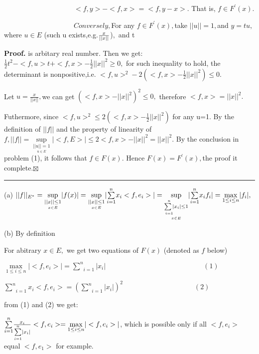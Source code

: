 \documentclass{article}
\newenvironment{proof}[1][Proof]{\noindent\textbf{#1.} }{\ \rule{0.5em}{0.5em}}
\begin{document}
$\qquad \qquad \qquad \qquad \qquad <f,y>-<f,x>=<f,y-x>.$ That is, $f\in
F^{\prime }(x).$

$\qquad \qquad \qquad \qquad \qquad Conversely,$For any $f\in F^{\prime
}(x), $take $||u||=1,$and $y=tu,$where $u\in E$ (such u exists,e.g.$\frac{x}{%
||x||} $)$,$ and t

\begin{proof}
is arbitary real number. Then we get: $\frac{1}{2}t^{2}-<f,u>t+<f,x>-\frac{1%
}{2}||x||^{2}\geq 0,$ for such inequality to hold, the determinant is
nonpositive,i.e. $<f,u>^{2}-2(<f,x>-\frac{1}{2}||x||^{2})\leq 0.$

Let $u=\frac{x}{||x||},$we can get $(<f,x>-||x||^{2})^{2}\leq 0,$ therefore $%
<f,x>=||x||^{2}.$

Futhermore, since $<f,u>^{2}\leq 2(<f,x>-\frac{1}{2}||x||^{2})$ for any 
\TEXTsymbol{\vert}\TEXTsymbol{\vert}u\TEXTsymbol{\vert}\TEXTsymbol{\vert}=1.
By the definition of $||f||$ and the property of linearity of $f,||f||=%
\underset{\underset{u\in E}{||u||=1}}{\sup }|<f,E>|\leq
2<f,x>-||x||^{2}=||x||^{2}.$ By the conclusion in problem (1), it follows
that $f\in F(x).$ Hence $F(x)=F^{\prime }(x),$the proof it complete.$%
\boxtimes $
\end{proof}


(a) $||f||_{E^{\ast }}=\underset{\underset{x\in E}{||x||\leq 1}}{\sup }%
|f(x)|=\underset{\underset{x\in E}{||x||\leq 1}}{\sup }|\underset{i=1}{%
\overset{n}{\sum }}x_{i}<f,e_{i}>|=\underset{\underset{x\in E}{\underset{i=1}%
{\overset{n}{\sum |}}x_{i}|\leq 1}}{\sup }|\underset{i=1}{\overset{n}{\sum }}%
x_{i}f_{i}|=\underset{1\leq i\leq n}{\max }|f_{i}|,$

(b) By definition %


For abitrary $x\in E,$ we get two equations of $F(x)$ (denoted as $f$ below)

$\underset{1\leq i\leq n}{\max }|<f,e_{i}>|=\underset{i=1}{\overset{n}{\sum }%
}|x_{i}|\qquad \qquad \qquad \qquad \qquad \qquad \qquad (1)$

$\underset{i=1}{\overset{n}{\sum }}x_{i}<f,e_{i}>=(\underset{i=1}{\overset{n}%
{\sum }}|x_{i}|)^{2}\qquad \qquad \qquad \qquad \qquad \ (2)$

from (1) and (2) we get:

$\underset{i=1}{\overset{n}{\sum }}\frac{x_{i}}{\underset{i=1}{\overset{n}{%
\sum }}|x_{i}|}<f,e_{i}>=\underset{1\leq i\leq n}{\max }|<f,e_{i}>|$, which
is possible only if all $<f,e_{i}>$ equal $<f,e_{1}>$ for example.
\end{document}
